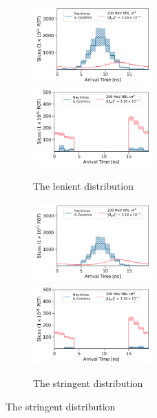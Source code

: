 \begin{figure}[htbp!]
        \begin{subfigure}[b]{1.0\textwidth}
            \includegraphics[width=0.5\textwidth]{relaxed_cut}
            \includegraphics[width=0.5\textwidth]{relaxed_cut_edge}
            \caption{The lenient distribution}%
	    \label{fig:final_relaxed}
     	    \vspace{0.5cm}
        \end{subfigure}
        \begin{subfigure}[b]{1.0\textwidth}
            \includegraphics[width=0.5\textwidth]{strict_cut}
            \includegraphics[width=0.5\textwidth]{strict_cut_edge}
            \caption{The stringent distribution}%
	    \label{fig:final_strict}

\end{subfigure}
\end{figure}
